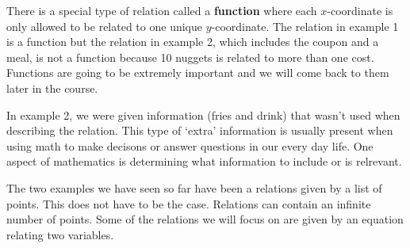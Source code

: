 \documentclass{ximera}
\begin{document}
\begin{example}
\begin{explanation}
\begin{image}
\end{image}
\end{explanation}
\end{example}


\begin{remark}
There is a special type of relation called a \textbf{function} where each $x$-coordinate is only allowed to be related to one unique $y$-coordinate.  The relation in example 1 is a function but the relation in example 2, which includes the coupon and a meal, is not a function because 10 nuggets is related to more than one cost.  Functions are going to be extremely important and we will come back to them later in the course.
\end{remark}

\begin{MM}
In example 2, we were given information (fries and drink) that wasn't used when describing the relation.  This type of `extra' information is usually present when using math to make decisons or answer questions in our every day life. One aspect of mathematics is determining what information to include or is relrevant.
\end{MM}

The two examples we have seen so far have been a relations given by a list of points.  This does not have to be the case.  Relations can contain an infinite number of points.  Some of the relations we will focus on are given by an equation relating two variables.
\end{document}
